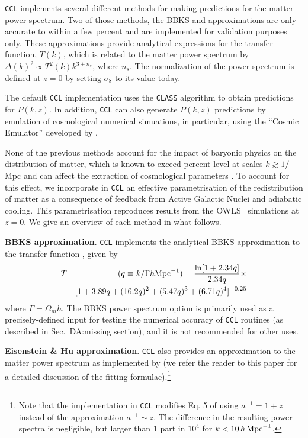 \documentclass[\docopts]{\docclass}
\newcommand{\damonge}[1]{\textcolor{green!55!blue}{DA:#1}}
\newcommand{\ccl}{{\tt CCL}\xspace}
\begin{document}
\ccl implements several different methods for making predictions for the matter power spectrum. Two of those methods, the BBKS \citep{BBKS} and \citet{1998ApJ...496..605E} approximations are only accurate to within a few percent and are implemented for validation purposes only. These approximations provide analytical expressions for the transfer function, $T(k)$, which is related to the matter power spectrum by $\Delta(k)^2 \propto T^2(k) k^{3+n_s}$, where $n_s$. The normalization of the power spectrum is defined at $z=0$ by setting $\sigma_8$ to its value today.

The default \ccl implementation uses the {\tt CLASS} algorithm \citet{class} to obtain predictions for $P(k,z)$. In addition, \ccl can also generate $P(k,z)$ predictions by emulation of cosmological numerical simuations, in particular, using the ``Cosmic Emulator'' developed by \citet{Lawrence17}. 

None of the previous methods account for the impact of baryonic physics on the distribution of matter, which is known to exceed percent level at scales $k \gtrsim 1/$Mpc \citep{vanDaalen11,Illustris,Hellwing16,Springel17} and can affect the extraction of cosmological parameters \citep{Semboloni11,Semboloni13,Mohammed14,Eifler15,Mohammed17}. To account for this effect, we incorporate in \ccl an effective parametrisation \citep{Schneider15} of the redistribution of matter as a consequence of feedback from Active Galactic Nuclei and adiabatic cooling. This parametrisation reproduces results from the OWLS~\citep{vanDaalen11} simulations at $z=0$. We give an overview of each method in what follows.

{\bf BBKS approximation}. \ccl implements the analytical BBKS approximation to the transfer function \citep{BBKS}, given by
\begin{eqnarray}
  T&&(q\equiv k/\Gamma h {\rm Mpc}^{-1}) = \frac{\ln[1+2.34q]}{2.34q}\times\\
  &&[1+3.89q+(16.2q)^2+(5.47q)^3+(6.71q)^4]^{-0.25}\nonumber
\end{eqnarray}
where $\Gamma = \Omega_m h$. The BBKS power spectrum option is primarily used as a precisely-defined input for testing the numerical accuracy of \ccl routines (as described in Sec.~\damonge{missing section}),%
and it is not recommended for other uses.

{\bf Eisenstein \& Hu approximation}. \ccl also provides an approximation to the matter power spectrum as implemented by \citet{1998ApJ...496..605E} (we refer the reader to this paper for a detailed discussion of the fitting formulae).\footnote{Note that the implementation in \ccl modifies Eq. 5 of \citet{1998ApJ...496..605E} using $a^{-1}=1+z$ instead of the approximation $a^{-1}\sim z$. The difference in the resulting power spectra is negligible, but larger than 1 part in $10^4$ for $k<10\,h\,{\rm Mpc}^{-1}$.}
\end{document}
